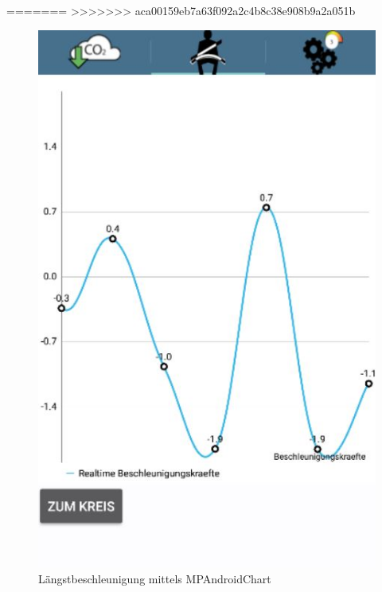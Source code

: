 



 \newline
=======
>>>>>>> aca00159eb7a63f092a2c4b8c38e908b9a2a051b
\begin{figure}[!tbp]
 	\centering
 	\begin{minipage}[b]{0.4\textwidth}
 		\includegraphics[width=\textwidth]{images/Liniendiagramm}
 		\caption{Längstbeschleunigung mittels MPAndroidChart}
 	\end{minipage}
 	\hfill
 	\begin{minipage}[b]{0.4\textwidth}

\end{minipage}
\end{figure}

